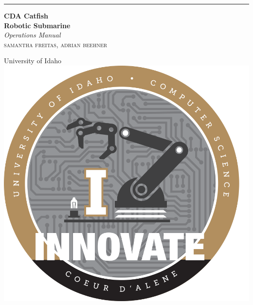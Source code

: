 \documentclass[a4paper, 11pt]{book} %
\begin{document}

\begin{titlepage} %
	
	\raggedleft %
	
	\rule{1pt}{\textheight} %
	\hspace{0.05\textwidth} %
	\parbox[b]{0.75\textwidth}{ %
		
		{\Huge\bfseries CDA Catfish
			 \\[0.5\baselineskip] Robotic Submarine}\\[2\baselineskip] %
		{\large\textit{Operations
		 Manual}}\\[4\baselineskip] %
		{\Large\textsc{samantha freitas, adrian beehner}} %
		
		\vspace{0.5\textheight} %
		
		{\noindent University of Idaho~~
			\includegraphics[width=0.08\linewidth]{Assets/compsci-cda-curcuit-sticker.png}}\\[\baselineskip] %
	}

\end{titlepage}

\end{document}
